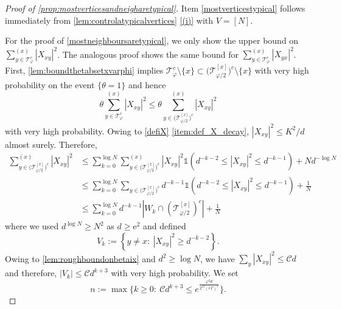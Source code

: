 \documentclass[11pt]{article}
\newcommand{\ee}{\mathrm{e}}
\newcommand{\abs}[1]{\left| #1 \right|}
\theoremstyle{plain}
\theoremstyle{remark}
\numberwithin{equation}{section}
\newcommand*\bset[1]{[#1]}
\begin{document}
	\begin{proof}[Proof of \cref{prop:mostverticesandneigharetypical}]
		Item \cref{mostverticestypical} follows immediately from  \cref{lem:controlatypicalvertices} \cref{(i)} with $V= [N]$.
		
		For the proof of  \cref{mostneighboursaretypical}, we only show  
	 the upper bound on $\sum_{y\in \mathcal{T}^c_{\varphi}}^{(x)} \abs{X_{xy}}^2$. The analogous proof shows the same bound for $\sum_{y\in \mathcal{T}^c_{\varphi}}^{(x)} \abs{X_{yx}}^2$. First, \cref{lem:boundthetabsetxvarphi} implies $\mathcal{T}_{\varphi}^c  \setminus \{ x\}  \subset \big(\mathcal{T}^{\bset{x}}_{\varphi/2}\big)^c \setminus \{ x\}  $ with very high probability on the event $\{\theta =1 \}$ and hence
		\begin{equation*}
			\theta \sum_{y \in \mathcal{T}_{\varphi}^c}^{(x)} \abs{X_{xy}}^2 \le \theta \sum_{y \in \big(\mathcal{T}^{\bset{x}}_{\varphi/2}\big)^c }^{(x)} \abs{X_{xy}}^2
		\end{equation*}
		with very high probability. Owing to \cref{defiX} \cref{item:def_X_decay}, $\abs{X_{xy}}^2\le K^2/d $ almost surely. Therefore, 
		\begin{align*}
			\sum_{y \in \big(\mathcal{T}^{\bset{x}}_{\varphi/2}\big)^c }^{(x)} \abs{X_{xy}}^2 &\le \sum_{k=0}^{\log N }\sum_{y \in \big(\mathcal{T}^{\bset{x}}_{\varphi/2}\big)^c }^{(x)} \abs{X_{xy}}^2 \mathds{1}\left( d^{-k-2}\le \abs{X_{xy}}^2 \le d^{-k-1}\right) + Nd^{-\log N }\\
			&\le \sum_{k=0}^{\log N}\sum_{y \in \big(\mathcal{T}^{\bset{x}}_{\varphi/2}\big)^c } d^{-k-1} \mathds{1}\left( d^{-k-2}\le \abs{X_{xy}}^2 \le d^{-k-1}\right) + \frac{1}{N}\\
			&\le  \sum_{k=0}^{\log N } d^{-k-1}\abs{W_k \cap\left(\mathcal{T}^{\bset{x}}_{\varphi/2}\right)^c}  + \frac{1}{N}
		\end{align*}
		where we used $d^{\log N } \ge N^2$ as $d \geq \ee^2$ and defined 
		\begin{equation*}
			V_k := \left\{ y \neq x:~ \abs{X_{xy}}^2\ge d^{-k-2}\right\}.
		\end{equation*}
		Owing to \cref{lem:roughboundonbetaix} and $d^2 \geq \log N$,  we have   $ \sum_{y } \abs{X_{xy}}^2  \le \mathcal{C}d$ and therefore, $\abs{V_{k}}\le \mathcal{C}d^{k+3}$ with very high probability. We set 
		\begin{equation*}
		n:= \max \biggl\{ k \ge 0:~ \mathcal{C}d^{k+3} \le e^{\frac{\varphi^2d}{2^{13} (e\Gamma)^2}} \biggr\}. 
			\end{equation*}

\end{proof}
\end{document}
